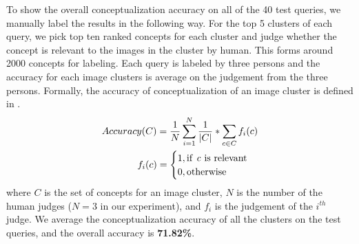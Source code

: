 To show the overall conceptualization accuracy on all of the 40 test queries,
we manually label the results in the following
way. For the top 5 clusters of each query,
we pick top ten ranked concepts for each cluster and judge whether the
concept is relevant to the images in the cluster by human.
This forms around 2000 concepts for labeling.
Each query is labeled by three persons and the accuracy for
each image clusters is average on the judgement from the three persons.
Formally, the accuracy of conceptualization
of an image cluster is defined in .
\begin{eqnarray}
Accuracy(C)=\frac{1}{N}\sum_{i=1}^{N}{\frac{1}{|C|}*\sum_{c \in C}{f_{i}(c)}}
\label{equ:conceptaccuracy}\\
f_{i}(c)=\begin{cases}1, \rm{if~ {\it c}~ is~ relevant}\cr 0, \rm{otherwise} \end{cases}
\end{eqnarray}
where $C$ is the set of concepts for an image cluster,
$N$ is the number of the human judges ($N=3$ in
our experiment), and $f_{i}$ is the judgement of the $i^{th}$ judge.
We average the conceptualization accuracy of all the clusters on
the test queries, and the overall accuracy is {\bf{71.82\%}}.





